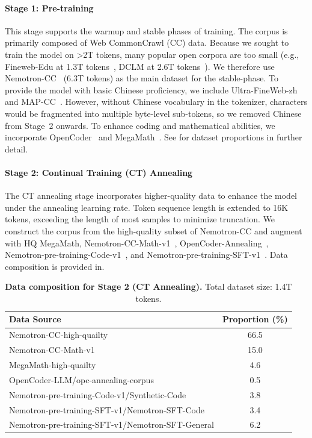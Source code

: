 \documentclass[]{bytedance_seed}
\newcommand{\1}{\mathbf{1}}
\begin{document}
\paragraph{Stage 1: Pre-training}
This stage supports the warmup and stable phases of training. The corpus is primarily composed of Web CommonCrawl (CC) data. Because we sought to train the model on >2T tokens, many popular open corpora are too small (e.g., Fineweb-Edu at 1.3T tokens~\cite{penedo2024fineweb}, DCLM at 2.6T tokens~\cite{li2024dclm}). We therefore use Nemotron-CC~\cite{su2024nemotron} (6.3T tokens) as the main dataset for the stable-phase. To provide the model with basic Chinese proficiency, we include Ultra-FineWeb-zh~\cite{wang2025ultra} and MAP-CC~\cite{du2024chinese}. However, without Chinese vocabulary in the tokenizer, characters would be fragmented into multiple byte-level sub-tokens, so we removed Chinese from Stage~2 onwards. To enhance coding and mathematical abilities, we incorporate OpenCoder~\cite{Huang2024OpenCoderTO} and MegaMath~\cite{zhou2025megamath}. See  for dataset proportions in further detail.

\paragraph{Stage 2: Continual Training (CT) Annealing}
The CT annealing stage incorporates higher-quality data to enhance the model under the annealing learning rate. Token sequence length is extended to 16K tokens, exceeding the length of most samples to minimize truncation. We construct the corpus from the high-quality subset of Nemotron-CC and augment with HQ MegaMath, Nemotron-CC-Math-v1~\cite{karimi2025nemotroncc,nvidia2025nvidianemotronnano2}, OpenCoder-Annealing~\cite{Huang2024OpenCoderTO}, Nemotron-pre-training-Code-v1~\cite{nvidia2025nvidianemotronnano2}, and Nemotron-pre-training-SFT-v1~\cite{nvidia2025nvidianemotronnano2}. Data composition is provided in.

\begin{table}[ht]
\small
\centering
\caption{\textbf{Data composition for Stage 2 (CT Annealing).} Total dataset size: 1.4T tokens.}
\label{tab:stage2_composition}
\begin{tabular}{l|c}
\toprule
\textbf{Data Source} & \textbf{Proportion (\%)} \\
\hline
Nemotron-CC-high-quailty & 66.5 \\
Nemotron-CC-Math-v1 & 15.0 \\
MegaMath-high-quailty & 4.6 \\
OpenCoder-LLM/opc-annealing-corpus & 0.5 \\
Nemotron-pre-training-Code-v1/Synthetic-Code & 3.8 \\
Nemotron-pre-training-SFT-v1/Nemotron-SFT-Code & 3.4 \\
Nemotron-pre-training-SFT-v1/Nemotron-SFT-General & 6.2 \\

\bottomrule
\end{tabular}
\end{table}
\end{document}
